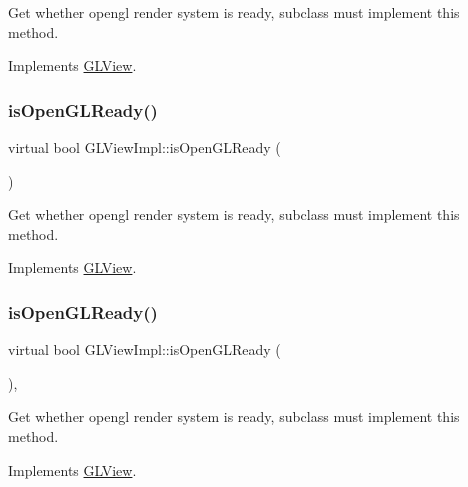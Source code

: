 Get whether opengl render system is ready, subclass must implement this method. 

Implements \hyperlink{classGLView_a23326d6cbff86205a0d5fa953557838d}{G\+L\+View}.

\mbox{\label{classGLViewImpl_a4fdf5280c768291ab6a46731639f8829}} 
\subsubsection{\texorpdfstring{is\+Open\+G\+L\+Ready()}{isOpenGLReady()}\hspace{0.1cm}{\footnotesize\ttfamily [4/9]}}
{\footnotesize\ttfamily virtual bool G\+L\+View\+Impl\+::is\+Open\+G\+L\+Ready (\begin{DoxyParamCaption}{ }\end{DoxyParamCaption})\hspace{0.3cm}{\ttfamily [virtual]}}

Get whether opengl render system is ready, subclass must implement this method. 

Implements \hyperlink{classGLView_a23326d6cbff86205a0d5fa953557838d}{G\+L\+View}.

\mbox{\label{classGLViewImpl_af539e58d1d28db65ba47f107c9c801d7}} 
\subsubsection{\texorpdfstring{is\+Open\+G\+L\+Ready()}{isOpenGLReady()}\hspace{0.1cm}{\footnotesize\ttfamily [5/9]}}
{\footnotesize\ttfamily virtual bool G\+L\+View\+Impl\+::is\+Open\+G\+L\+Ready (\begin{DoxyParamCaption}{ }\end{DoxyParamCaption})\hspace{0.3cm}{\ttfamily [override]}, {\ttfamily [virtual]}}

Get whether opengl render system is ready, subclass must implement this method. 

Implements \hyperlink{classGLView_a23326d6cbff86205a0d5fa953557838d}{G\+L\+View}.

